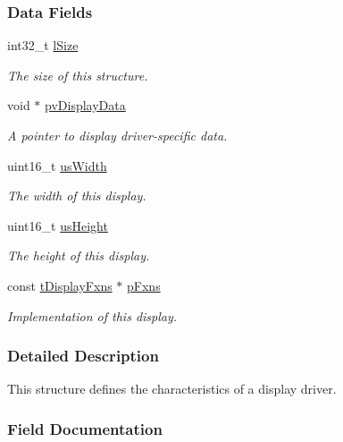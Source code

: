 \subsubsection*{Data Fields}
\begin{DoxyCompactItemize}
\item 
int32\+\_\+t \hyperlink{structt_display_ac792c2ab29b09946b4311af8d6c676b3}{l\+Size}
\begin{DoxyCompactList}\small\item\em The size of this structure. \end{DoxyCompactList}\item 
void $\ast$ \hyperlink{structt_display_ac21f8dbe2f24b974131166da5e6579f1}{pv\+Display\+Data}
\begin{DoxyCompactList}\small\item\em A pointer to display driver-\/specific data. \end{DoxyCompactList}\item 
uint16\+\_\+t \hyperlink{structt_display_a17ed92807aec6dcd2b786c323870779c}{us\+Width}
\begin{DoxyCompactList}\small\item\em The width of this display. \end{DoxyCompactList}\item 
uint16\+\_\+t \hyperlink{structt_display_ab4dad5fc1b211289a7ee0ed0d5957c07}{us\+Height}
\begin{DoxyCompactList}\small\item\em The height of this display. \end{DoxyCompactList}\item 
const \hyperlink{structt_display_fxns}{t\+Display\+Fxns} $\ast$ \hyperlink{structt_display_af4f69b9c1c6f568250d0fe13e9f95c76}{p\+Fxns}
\begin{DoxyCompactList}\small\item\em Implementation of this display. \end{DoxyCompactList}\end{DoxyCompactItemize}


\subsubsection{Detailed Description}
This structure defines the characteristics of a display driver. 

\subsubsection{Field Documentation}
